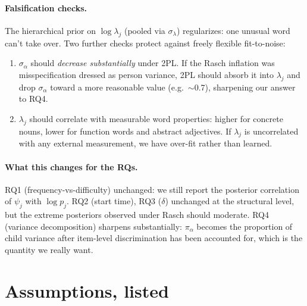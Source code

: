 \documentclass[11pt]{article}
\begin{document}
\paragraph{Falsification checks.} The hierarchical prior on
\(\log \lambda_j\) (pooled via \(\sigma_\lambda\)) regularizes: one
unusual word can't take over. Two further checks protect against
freely flexible fit-to-noise:
\begin{enumerate}[leftmargin=1.3em]
\item \(\sigma_\alpha\) should \emph{decrease substantially} under 2PL.
If the Rasch inflation was misspecification dressed as person variance,
2PL should absorb it into \(\lambda_j\) and drop \(\sigma_\alpha\) toward
a more reasonable value (e.g.\ \(\sim\)0.7), sharpening our answer to
RQ4.
\item \(\lambda_j\) should correlate with measurable word properties:
higher for concrete nouns, lower for function words and abstract
adjectives. If \(\lambda_j\) is uncorrelated with any external
measurement, we have over-fit rather than learned.
\end{enumerate}

\paragraph{What this changes for the RQs.}
RQ1 (frequency-vs-difficulty) unchanged: we still report the posterior
correlation of \(\psi_j\) with \(\log p_j\). RQ2 (start time), RQ3
(\(\delta\)) unchanged at the structural level, but the extreme
posteriors observed under Rasch should moderate. RQ4 (variance
decomposition) sharpens substantially: \(\pi_\alpha\) becomes the
proportion of child variance after item-level discrimination has been
accounted for, which is the quantity we really want.

\section{Assumptions, listed}
\end{document}
